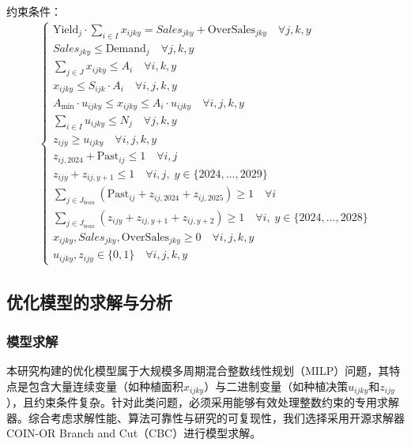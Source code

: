 \documentclass[withoutpreface,bwprint]{cumcmthesis} %
\begin{document}
约束条件：
\begin{align*}
	\left\{
	\begin{array}{l}
		\text{Yield}_j \cdot \sum_{i \in I} x_{ijky} = Sales_{jky} + \text{OverSales}_{jky} \quad \forall j,k,y     \\
		Sales_{jky} \le \text{Demand}_j \quad \forall j,k,y                                                         \\
		\sum_{j \in J} x_{ijky} \le A_i \quad \forall i,k,y                                                         \\
		x_{ijky} \le S_{ijk} \cdot A_i \quad \forall i,j,k,y                                                        \\
		A_{\min} \cdot u_{ijky} \le x_{ijky} \le A_i \cdot u_{ijky} \quad \forall i,j,k,y                           \\
		\sum_{i \in I} u_{ijky} \le N_j \quad \forall j,k,y                                                         \\
		z_{ijy} \ge u_{ijky} \quad \forall i,j,k,y                                                                  \\
		z_{ij,2024} + \text{Past}_{ij} \le 1 \quad \forall i,j                                                      \\
		z_{ijy} + z_{ij,y+1} \le 1 \quad \forall i,j, \; y \in \{2024,...,2029\}                                    \\
		\sum_{j \in J_{bean}} (\text{Past}_{ij} + z_{ij,2024} + z_{ij,2025}) \ge 1 \quad \forall i                  \\
		\sum_{j \in J_{bean}} (z_{ijy} + z_{ij,y+1} + z_{ij,y+2}) \ge 1 \quad \forall i, \; y \in \{2024,...,2028\} \\
		x_{ijky}, Sales_{jky}, \text{OverSales}_{jky} \ge 0 \quad \forall i,j,k,y                                   \\
		u_{ijky}, z_{ijy} \in \{0, 1\} \quad \forall i,j,k,y
	\end{array}
	\right.
\end{align*}

\subsection{优化模型的求解与分析}

\subsubsection{模型求解}
本研究构建的优化模型属于大规模多周期混合整数线性规划（MILP）问题，其特点是包含大量连续变量（如种植面积$x_{ijky}$）与二进制变量（如种植决策$u_{ijky}$和$z_{ijy}$），且约束条件复杂。针对此类问题，必须采用能够有效处理整数约束的专用求解器。综合考虑求解性能、算法可靠性与研究的可复现性，我们选择采用开源求解器COIN-OR Branch and Cut（CBC）进行模型求解。
\end{document}
